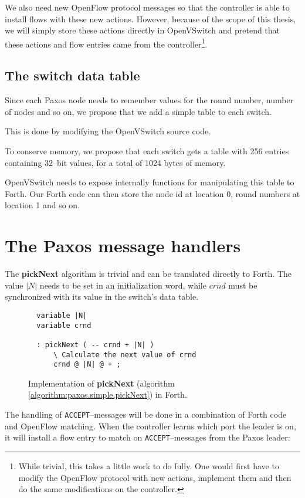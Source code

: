 We also need new OpenFlow protocol messages so that the controller is able
to install flows with these new actions.  However, because of the scope of
this thesis, we will simply store these actions directly in OpenVSwitch and
pretend that these actions and flow entries came from the
controller\footnote{While trivial, this takes a little work to do fully.
One would first have to modify the OpenFlow protocol with new actions,
implement them and then do the same modifications on the controller.}.

\subsection{The switch data table}

Since each Paxos node needs to remember values for the round number, number
of nodes and so on, we propose that we add a simple table to each switch.

This is done by modifying the OpenVSwitch source code.

To conserve memory, we propose that each switch gets a table with 256
entries containing 32--bit values, for a total of 1024 bytes of memory.

OpenVSwitch needs to expose internally functions for manipulating this table
to Forth.  Our Forth code can then store the node id at location 0, round
numbers at location 1 and so on.

\section{The Paxos message handlers}

The \textbf{pickNext} algorithm is trivial and can be translated directly to
Forth.  The value $|N|$ needs to be set in an initialization word,
while $crnd$ must be synchronized with its value in the switch's data table.

\begin{figure}[H]
  \centering
  \begin{Verbatim}
  variable |N|
  variable crnd

  : pickNext ( -- crnd + |N| )
      \ Calculate the next value of crnd
      crnd @ |N| @ + ;
  \end{Verbatim}
  \label{program.forth.pickNext}
  \caption{Implementation of \textbf{pickNext} (algorithm
      \ref{algorithm:paxos.simple.pickNext}) in Forth.}
\end{figure}

The handling of \texttt{ACCEPT}--messages will be done in a combination of
Forth code and OpenFlow matching.  When the controller learns which port the
leader is on, it will install a flow entry to match on
\texttt{ACCEPT}--messages from the Paxos leader:

